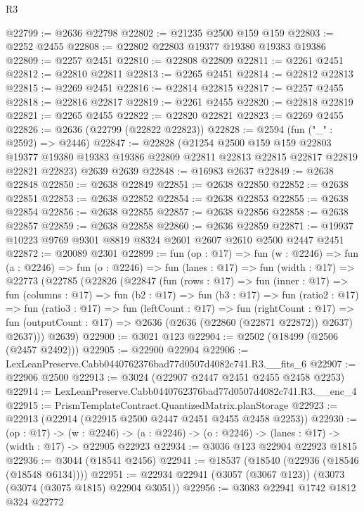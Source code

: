 \begin{lexlean}{R3}
\begin{coremodule}
@22799 := @2636 @22798
@22802 := @21235 @2500 @159 @159
@22803 := @2252 @2455
@22808 := @22802 @22803 @19377 @19380 @19383 @19386
@22809 := @2257 @2451
@22810 := @22808 @22809
@22811 := @2261 @2451
@22812 := @22810 @22811
@22813 := @2265 @2451
@22814 := @22812 @22813
@22815 := @2269 @2451
@22816 := @22814 @22815
@22817 := @2257 @2455
@22818 := @22816 @22817
@22819 := @2261 @2455
@22820 := @22818 @22819
@22821 := @2265 @2455
@22822 := @22820 @22821
@22823 := @2269 @2455
@22826 := @2636 (@22799 (@22822 @22823))
@22828 := @2594 (fun ("_" : @2592) => @2446)
@22847 := @22828
    (@21254
      @2500
      @159
      @159
      @22803
      @19377
      @19380
      @19383
      @19386
      @22809
      @22811
      @22813
      @22815
      @22817
      @22819
      @22821
      @22823)
    @2639
    @2639
@22848 := @16983 @2637
@22849 := @2638 @22848
@22850 := @2638 @22849
@22851 := @2638 @22850
@22852 := @2638 @22851
@22853 := @2638 @22852
@22854 := @2638 @22853
@22855 := @2638 @22854
@22856 := @2638 @22855
@22857 := @2638 @22856
@22858 := @2638 @22857
@22859 := @2638 @22858
@22860 := @2636 @22859
@22871 := @19937 @10223 @9769 @9301 @8819 @8324 @2601 @2607 @2610 @2500 @2447 @2451
@22872 := @20089 @2301
@22899 := fun (op : @17) =>
  fun (w : @2246) =>
  fun (a : @2246) =>
  fun (o : @2246) =>
  fun (lanes : @17) =>
  fun (width : @17) =>
  @22773
    (@22785
      (@22826
        (@22847
          (fun (rows : @17) =>
          fun (inner : @17) =>
          fun (columns : @17) =>
          fun (b2 : @17) =>
          fun (b3 : @17) =>
          fun (ratio2 : @17) =>
          fun (ratio3 : @17) =>
          fun (leftCount : @17) =>
          fun (rightCount : @17) =>
          fun (outputCount : @17) => @2636 (@2636 (@22860 (@22871 @22872)) @2637) @2637)))
      @2639)
@22900 := @3021 @123
@22904 := @2502 (@18499 (@2506 (@2457 @2492)))
@22905 := @22900 @22904
@22906 := LexLeanPreserve.Cabb0440762376bad77d0507d4082c741.R3.__fits_6
@22907 := @22906 @2500
@22913 := @3024 (@22907 @2447 @2451 @2455 @2458 @2253)
@22914 := LexLeanPreserve.Cabb0440762376bad77d0507d4082c741.R3.__enc_4
@22915 := PrismTemplateContract.QuantizedMatrix.planStorage
@22923 := @22913 (@22914 (@22915 @2500 @2447 @2451 @2455 @2458 @2253))
@22930 := (op : @17) ->
  (w : @2246) -> (a : @2246) -> (o : @2246) -> (lanes : @17) -> (width : @17) -> @22905 @22923
@22934 := @3036 @123 @22904 @22923 @1815
@22936 := @3044 (@18541 @2456)
@22941 := @18537 (@18540 (@22936 (@18546 (@18548 @6134))))
@22951 := @22934 @22941 (@3057 (@3067 @123)) (@3073 (@3074 (@3075 @1815) @22904 @3051))
@22956 := @3083 @22941 @1742 @1812 @324 @22772

\end{coremodule}
\end{lexlean}
